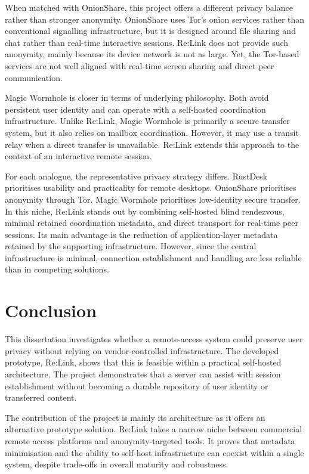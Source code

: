 \documentclass[12pt,a4paper,oneside]{report}
\begin{document}
When matched with OnionShare, this project offers a different privacy balance rather than stronger anonymity. OnionShare uses Tor's onion services rather than conventional signalling infrastructure, but it is designed around file sharing and chat rather than real-time interactive sessions. Re:Link does not provide such anonymity, mainly because its device network is not as large. Yet, the Tor-based services are not well aligned with real-time screen sharing and direct peer communication.

Magic Wormhole is closer in terms of underlying philosophy. Both avoid persistent user identity and can operate with a self-hosted coordination infrastructure. Unlike Re:Link, Magic Wormhole is primarily a secure transfer system, but it also relies on mailbox coordination. However, it may use a transit relay when a direct transfer is unavailable. Re:Link extends this approach to the context of an interactive remote session.

For each analogue, the representative privacy strategy differs. RustDesk prioritises usability and practicality for remote desktops. OnionShare prioritises anonymity through Tor. Magic Wormhole prioritises low-identity secure transfer. In this niche, Re:Link stands out by combining self-hosted blind rendezvous, minimal retained coordination metadata, and direct transport for real-time peer sessions. Its main advantage is the reduction of application-layer metadata retained by the supporting infrastructure. However, since the central infrastructure is minimal, connection establishment and handling are less reliable than in competing solutions.


\chapter{Conclusion}
\label{ch:conclusion}

This dissertation investigates whether a remote-access system could preserve user privacy without relying on vendor-controlled infrastructure. The developed prototype, Re:Link, shows that this is feasible within a practical self-hosted architecture. The project demonstrates that a server can assist with session establishment without becoming a durable repository of user identity or transferred content.

The contribution of the project is mainly its architecture as it offers an alternative prototype solution. Re:Link takes a narrow niche between commercial remote access platforms and anonymity-targeted tools. It proves that metadata minimisation and the ability to self-host infrastructure can coexist within a single system, despite trade-offs in overall maturity and robustness.
\end{document}
